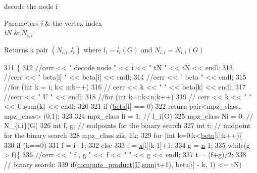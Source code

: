 decode the node i 


\begin{DoxyParams}{Parameters}
{\em i} & the vertex index \\
\hline
{\em tN} & $\tilde{N}_{i,i}$ \\
\hline
\end{DoxyParams}
\begin{DoxyReturn}{Returns}
a pair $(N_{i,i}, l_i)$ where $l_i = l_i(G)$ and $N_{i,i} = N_{i,i}(G)$ 
\end{DoxyReturn}

\begin{DoxyCode}
311 \{
312   \textcolor{comment}{//cerr << " decode node " << i << " tN " << tN << endl;}
313   \textcolor{comment}{//cerr << " beta[i] " << beta[i] << endl;}
314   \textcolor{comment}{//cerr << " beta " << endl;}
315   \textcolor{comment}{//for (int k = i; k< n;k++)}
316   \textcolor{comment}{//  cerr << k << " " << beta[k] << endl;}
317   \textcolor{comment}{//cerr << " U " << endl;}
318   \textcolor{comment}{//for (int k=i;k<n;k++)}
319   \textcolor{comment}{//  cerr << k << " " << U.sum(k) << endl;}
320 
321   \textcolor{keywordflow}{if} (\hyperlink{classgraph__decoder_aa57c11e4c09c52101682ff83286162f7}{beta}[i] == 0)
322     \textcolor{keywordflow}{return} pair<mpz\_class, mpz\_class> (0,1);
323 
324   mpz\_class li = 1; \textcolor{comment}{// l\_i(G)}
325   mpz\_class Ni = 0; \textcolor{comment}{// N\_\{i,i\}(G)}
326   \textcolor{keywordtype}{int} f, g; \textcolor{comment}{// endpoints for the binary search}
327   \textcolor{keywordtype}{int} t; \textcolor{comment}{// midpoint for the binary search}
328   mpz\_class zik, lik; 
329   \textcolor{keywordflow}{for} (\textcolor{keywordtype}{int} k=0;k<\hyperlink{classgraph__decoder_aa57c11e4c09c52101682ff83286162f7}{beta}[i];k++)\{
330     \textcolor{keywordflow}{if} (k==0)
331       f = i+1;
332     \textcolor{keywordflow}{else}
333       f = \hyperlink{classgraph__decoder_aa3f2776afe387668cf7f68109428e14e}{x}[i][k-1]+1;
334     g = \hyperlink{classgraph__decoder_a6bc1e72b2f7a913d14b789a6c2d92c1e}{n}-1;
335     \textcolor{keywordflow}{while}(g > f)\{
336       \textcolor{comment}{//cerr << " f , g " << f << " " << g << endl;}
337       t = (f+g)/2;
338       \textcolor{comment}{// binary search:}
339       \textcolor{keywordflow}{if}(\hyperlink{compression__helper_8cpp_ae2afb43aabe50f7d42aae8f82b5a35f4}{compute\_product}(\hyperlink{classgraph__decoder_a2fa9fec2cef06aaa410e57fb59d5c1ad}{U}.\hyperlink{classreverse__fenwick__tree_a672731fd6395b4853430073a099a80e6}{sum}(t+1), beta[i] - k, 1) <= tN)

\end{DoxyCode}
